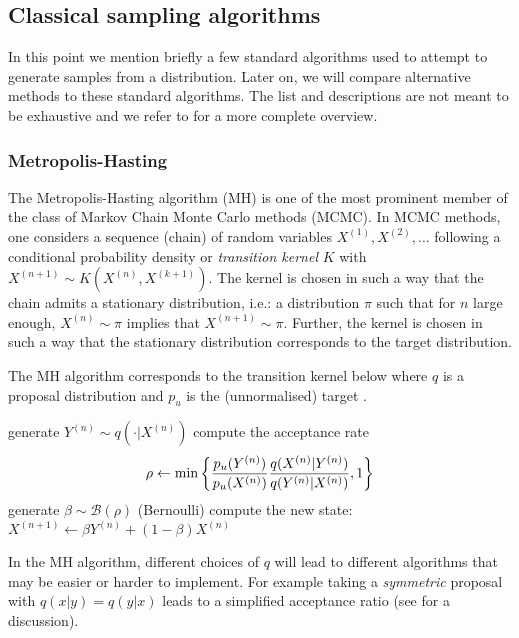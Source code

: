 \subsection{Classical sampling algorithms}

In this point we mention briefly a few standard algorithms used to attempt to generate samples from a distribution.
Later on, we will compare alternative methods to these standard algorithms.
The list and descriptions are not meant to be exhaustive and we refer to \citep{robert04, green15} for a more complete overview.

\subsubsection{Metropolis-Hasting}
The Metropolis-Hasting algorithm (MH) is one of the most prominent member of the class of Markov Chain Monte Carlo methods (MCMC). In MCMC methods, one considers a sequence (chain) of random variables $X^{(1)}, X^{(2)},\dots$ following a conditional probability density or \emph{transition kernel} $K$ with $X^{(n+1)} \sim K(X^{(n)}, X^{(k+1)})$. 
The kernel is chosen in such a way that the chain admits a stationary distribution, i.e.: a distribution $\pi$ such that for $n$ large enough, $X^{(n)}\sim \pi$ implies that $X^{(n+1)}\sim\pi$. Further, the kernel is chosen in such a way that the stationary distribution corresponds to the target distribution.

The MH algorithm corresponds to the transition kernel below where $q$ is a proposal distribution and $p_{u}$ is the (unnormalised) target \citep[chapter 6]{robert04}.

\begin{algorithm}[!h]\small
	\caption{\label{alg:mh-kernel}}
	\begin{algorithmic}[1]
		\State generate $Y^{(n)}\sim q(\cdot | X^{(n)})$
		\State compute the acceptance rate
			$$ \rho \leftarrow \min\left\{ {p_{u}(Y^{(n)})\over p_{u}(X^{(n)})}{q(X^{(n)}|Y^{(n)})\over q(Y^{(n)}|X^{(n)})}, 1\right\} $$
		\State generate $\beta\sim \mathcal B(\rho)$ (Bernoulli)
		\State compute the new state: $X^{(n+1)} \leftarrow \beta Y^{(n)} + (1-\beta)X^{(n)} $
	\end{algorithmic}
\end{algorithm}

In the MH algorithm, different choices of $q$ will lead to different algorithms that may be easier or harder to implement. For example taking a \emph{symmetric} proposal with $q(x|y)=q(y|x)$ leads to a simplified acceptance ratio (see \citet{green15} for a discussion).

